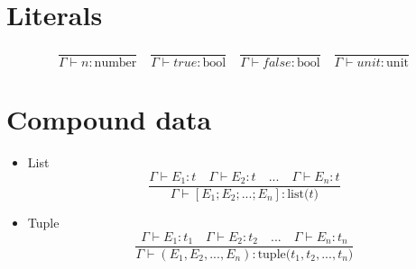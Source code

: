 \documentclass[]{article}
\title{}
\author{}
\date{}
\begin{document}
	\section{Literals}
		\[
		\frac{}{\Gamma \vdash n: \text{number}} \quad
		\frac{}{\Gamma \vdash true: \text{bool}} \quad
		\frac{}{\Gamma \vdash false: \text{bool}} \quad
		\frac{}{\Gamma \vdash unit: \text{unit}}
		\]
		
	\section{Compound data}
		\begin{itemize}
			\item List
			\[
			\frac{\Gamma \vdash E_1: t \quad \Gamma \vdash E_2: t \quad ... \quad \Gamma \vdash E_n: t}{\Gamma \vdash [E_1; E_2; ...; E_n]: \text{list($t$)}}
			\]
			\item Tuple
			\[
			\frac{\Gamma \vdash E_1: t_1 \quad \Gamma \vdash E_2: t_2 \quad ... \quad \Gamma \vdash E_n: t_n}{\Gamma \vdash (E_1, E_2, ..., E_n): \text{tuple($t_1, t_2,..., t_n$)}}
			\]
		\end{itemize}
		
	
\end{document}
